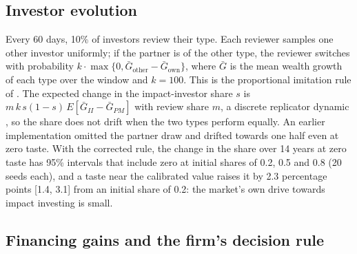 \documentclass[11pt]{article}
\begin{document}
\subsection{Investor evolution}

Every 60 days, 10\% of investors review their type. Each reviewer samples one other investor uniformly; if the partner is of the other type, the reviewer switches with probability $k \cdot \max\{0, \bar G_{\text{other}} - \bar G_{\text{own}}\}$, where $\bar G$ is the mean wealth growth of each type over the window and $k = 100$. This is the proportional imitation rule of \citet{schlag1998imitate}. The expected change in the impact-investor share $s$ is $m\,k\,s(1-s)\,E[\bar G_{II} - \bar G_{PM}]$ with review share $m$, a discrete replicator dynamic \citep{taylor1978evolutionary}, so the share does not drift when the two types perform equally. An earlier implementation omitted the partner draw and drifted towards one half even at zero taste. With the corrected rule, the change in the share over 14 years at zero taste has 95\% intervals that include zero at initial shares of 0.2, 0.5 and 0.8 (20 seeds each), and a taste near the calibrated value raises it by 2.3 percentage points [1.4, 3.1] from an initial share of 0.2: the market's own drive towards impact investing is small.

\subsection{Financing gains and the firm's decision rule}
\end{document}
